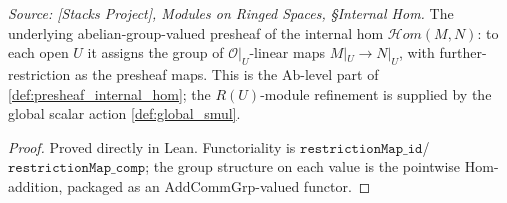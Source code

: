 \begin{definition}\leanok
  \label{def:internal_hom_presheaf}
  \textit{Source: [Stacks Project], Modules on Ringed Spaces, \S Internal Hom.}
  The underlying abelian-group-valued presheaf of the internal hom
  \(\mathcal{H}om(M, N)\): to each open \(U\) it assigns the group of
  \(\mathcal{O}|_U\)-linear maps \(M|_U \to N|_U\), with further-restriction as the
  presheaf maps. This is the \(\mathrm{Ab}\)-level part of
  \cref{def:presheaf_internal_hom}; the \(R(U)\)-module refinement is supplied by the
  global scalar action \cref{def:global_smul}.
\end{definition}
\begin{proof}
  \leanok
  Proved directly in Lean. Functoriality is \(\mathtt{restrictionMap\_id}\)/%
  \(\mathtt{restrictionMap\_comp}\); the group structure on each value is the pointwise
  \(\mathrm{Hom}\)-addition, packaged as an \(\mathrm{AddCommGrp}\)-valued functor.
\end{proof}

